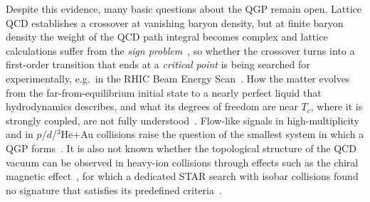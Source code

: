 Despite this evidence, many basic questions about the QGP remain open.
%
Lattice QCD establishes a crossover at vanishing baryon density, but at finite baryon density the weight of the QCD path integral becomes complex and lattice calculations suffer from the \emph{sign problem}~\cite{deForcrand:2009zkb}, so whether the crossover turns into a first-order transition that ends at a \emph{critical point} is being searched for experimentally, e.g.\ in the RHIC Beam Energy Scan~\cite{Bzdak:2019pkr}.
%
How the matter evolves from the far-from-equilibrium initial state to a nearly perfect liquid that hydrodynamics describes, and what its degrees of freedom are near \(T_c\), where it is strongly coupled, are not fully understood~\cite{Berges:2020fwq}.
%
Flow-like signals in high-multiplicity \pp and in \(p\)/\(d\)/\(^3\)He+Au collisions raise the question of the smallest system in which a QGP forms~\cite{Nagle:2018nvi}.
%
It is also not known whether the topological structure of the QCD vacuum can be observed in heavy-ion collisions through effects such as the chiral magnetic effect~\cite{Kharzeev:2015znc}, for which a dedicated STAR search with isobar collisions found no signature that satisfies its predefined criteria~\cite{STAR:2021mii}.


